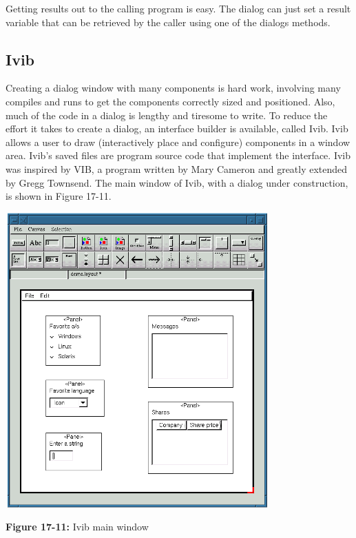 Getting results out to the calling program is easy. The dialog
can just set a result variable that can be retrieved by
the caller using one of the dialog{\textquotesingle}s methods.

\subsection[Ivib]{Ivib}
Creating a dialog window with many components is hard
work, involving many compiles and runs to get the components
correctly sized and positioned. Also, much of the code in a
dialog is lengthy and tiresome to write. To reduce the effort it
takes to create a dialog, an
interface builder is available, called Ivib.
Ivib allows a user to draw (interactively place and configure)
components in a window area. Ivib's saved files are program source code
that implement the interface. Ivib was inspired by VIB, a program
written by Mary Cameron and greatly extended by
Gregg Townsend. The main window of Ivib, with a
dialog under construction, is shown in Figure 17-11.



\begin{center}
\includegraphics[width=4.0in,height=4.46in]{ub-img/ub-img60.png}
\end{center}

{\sffamily\bfseries Figure 17-11:}
{\sffamily Ivib main window}

